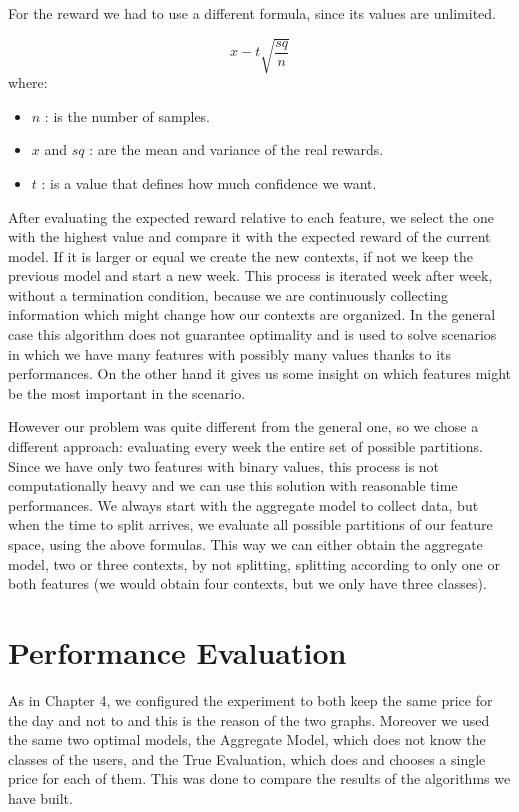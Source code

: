 For the reward we had to use a different formula, since its values are unlimited.

\begin{equation}
    x - t \sqrt{\frac{sq} {n}}
\end{equation}
where:
\begin{itemize}
    \item $n$ : is the number of samples.
    \item $x$ and $sq$ : are the mean and variance of the real rewards.
    \item $t$ : is a value that defines how much confidence we want.
\end{itemize}

After evaluating the expected reward relative to each feature, we select the one with the highest value and compare it with the expected reward of the current model.
If it is larger or equal we create the new contexts, if not we keep the previous model and start a new week.
This process is iterated week after week, without a termination condition, because we are continuously collecting information which might change how our contexts are organized.
In the general case this algorithm does not guarantee optimality and is used to solve scenarios in which we have many features with possibly many values thanks to its performances.
On the other hand it gives us some insight on which features might be the most important in the scenario.

However our problem was quite different from the general one, so we chose a different approach: evaluating every week the entire set of possible partitions.
Since we have only two features with binary values, this process is not computationally heavy and we can use this solution with reasonable time performances.
We always start with the aggregate model to collect data, but when the time to split arrives, we evaluate all possible partitions of our feature space, using the above formulas.
This way we can either obtain the aggregate model, two or three contexts, by not splitting, splitting according to only one or both features (we would obtain four contexts, but we only have three classes).


\section{Performance Evaluation}\label{sec:performance-evaluation-5}

As in Chapter 4, we configured the experiment to both keep the same price for the day and not to and this is the reason of the two graphs.
Moreover we used the same two optimal models, the Aggregate Model, which does not know the classes of the users, and the True Evaluation, which does and chooses a single price for each of them.
This was done to compare the results of the algorithms we have built.

